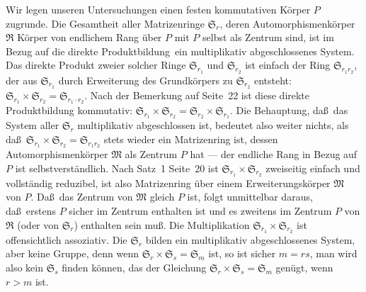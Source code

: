 \documentclass[12pt,a4paper]{article}
\theoremstyle{plain}
\theoremstyle{definition}
\theoremstyle{remark}
\begin{document}
Wir legen unseren Untersuchungen einen festen kommutativen K\"orper $P$
zugrunde. Die Gesamtheit aller Matrizenringe $\mathfrak{S}_{r}$, deren Automorphismenk\"orper
$\mathfrak{R}$ K\"orper von endlichem Rang \"uber $P$ mit $P$ selbst als Zentrum sind, ist im
Bezug auf die \glqq direkte Produktbildung\grqq\ ein multiplikativ abgeschlossenes
System. Das direkte Produkt zweier solcher Ringe $\mathfrak{S}_{r_{1}}$ und $\mathfrak{S}_{r_{2}}$ ist einfach der
Ring $\mathfrak{S}_{r_{1}r_{2}}$, der aus $\mathfrak{S}_{r_{1}}$ durch Erweiterung des Grundk\"orpers zu
$\mathfrak{S}_{r_{2}}$ entsteht: $\mathfrak{S}_{r_{1}} \times \mathfrak{S}_{r_{2}} = \mathfrak{S}_{r_{1} \cdot r_{2}}$.
Nach der Bemerkung auf Seite~22 ist diese direkte Produktbildung kommutativ:
$\mathfrak{S}_{r_{1}} \times \mathfrak{S}_{r_{2}} = \mathfrak{S}_{r_{2}} \times \mathfrak{S}_{r_{1}}$.
Die Behauptung, da\ss\ das System aller $\mathfrak{S}_{r}$ multiplikativ abgeschlossen ist,
bedeutet also weiter nichts, als da\ss\ $\mathfrak{S}_{r_{1}} \times \mathfrak{S}_{r_{2}} = \mathfrak{S}_{r_{1}r_{2}}$
stets wieder ein Matrizenring ist, dessen Automorphismenk\"orper $\mathfrak{M}$ als Zentrum
$P$ hat --- der endliche Rang in Bezug auf $P$ ist selbstverst\"andlich. Nach
Satz~1 Seite~20 ist $\mathfrak{S}_{r_{1}} \times \mathfrak{S}_{r_{2}}$ zweiseitig einfach und vollst\"andig reduzibel,
ist also Matrizenring \"uber einem Erweiterungsk\"orper $\mathfrak{M}$ von $P$. Da\ss\ das
Zentrum von $\mathfrak{M}$ gleich $P$ ist, folgt unmittelbar daraus, da\ss\ erstens $P$
sicher im Zentrum enthalten ist und es zweitens im Zentrum $P$ von
$\mathfrak{R}$ (oder von $\mathfrak{S}_{r}$) enthalten sein mu\ss. Die Multiplikation $\mathfrak{S}_{r_{1}} \times \mathfrak{S}_{r_{2}}$
ist offensichtlich assoziativ. Die $\mathfrak{S}_{r}$ bilden ein multiplikativ abgeschlossenes
System, aber keine Gruppe, denn wenn $\mathfrak{S}_{r} \times \mathfrak{S}_{s} = \mathfrak{S}_{m}$ ist, so ist sicher
$m = rs$, man wird also kein $\mathfrak{S}_{s}$ finden k\"onnen, das der Gleichung
$\mathfrak{S}_{r} \times \mathfrak{S}_{s} = \mathfrak{S}_{m}$ gen\"ugt, wenn $r > m$ ist.
\end{document}

